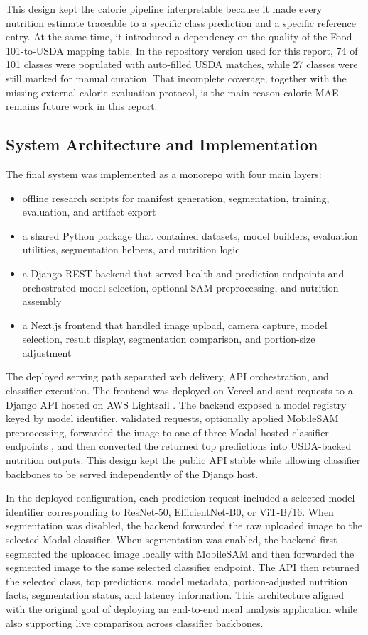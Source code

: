 \documentclass[sigconf,nonacm,11pt]{acmart}
\begin{document}
This design kept the calorie pipeline interpretable because it made every nutrition estimate traceable to a specific class prediction and a specific reference entry. At the same time, it introduced a dependency on the quality of the Food-101-to-USDA mapping table. In the repository version used for this report, 74 of 101 classes were populated with auto-filled USDA matches, while 27 classes were still marked for manual curation. That incomplete coverage, together with the missing external calorie-evaluation protocol, is the main reason calorie MAE remains future work in this report.

\subsection{System Architecture and Implementation}
The final system was implemented as a monorepo with four main layers:

\begin{itemize}
\item offline research scripts for manifest generation, segmentation, training, evaluation, and artifact export
\item a shared Python package that contained datasets, model builders, evaluation utilities, segmentation helpers, and nutrition logic
\item a Django REST backend that served health and prediction endpoints and orchestrated model selection, optional SAM preprocessing, and nutrition assembly
\item a Next.js frontend that handled image upload, camera capture, model selection, result display, segmentation comparison, and portion-size adjustment
\end{itemize}

The deployed serving path separated web delivery, API orchestration, and classifier execution. The frontend was deployed on Vercel \cite{vercel,nextjs} and sent requests to a Django API hosted on AWS Lightsail \cite{lightsaildocs,django}. The backend exposed a model registry keyed by model identifier, validated requests, optionally applied MobileSAM preprocessing, forwarded the image to one of three Modal-hosted classifier endpoints \cite{modaldocs}, and then converted the returned top predictions into USDA-backed nutrition outputs. This design kept the public API stable while allowing classifier backbones to be served independently of the Django host.

In the deployed configuration, each prediction request included a selected model identifier corresponding to ResNet-50, EfficientNet-B0, or ViT-B/16. When segmentation was disabled, the backend forwarded the raw uploaded image to the selected Modal classifier. When segmentation was enabled, the backend first segmented the uploaded image locally with MobileSAM and then forwarded the segmented image to the same selected classifier endpoint. The API then returned the selected class, top predictions, model metadata, portion-adjusted nutrition facts, segmentation status, and latency information. This architecture aligned with the original goal of deploying an end-to-end meal analysis application while also supporting live comparison across classifier backbones.
\end{document}
